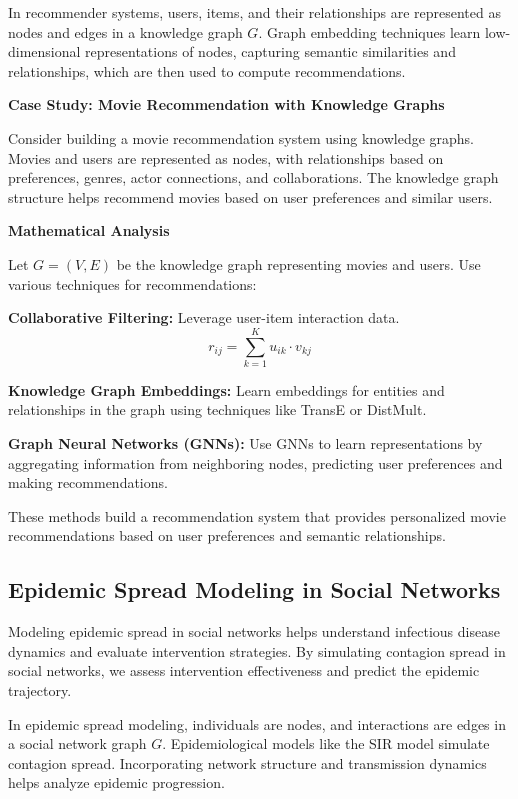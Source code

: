 \documentclass[12pt]{book} %
\begin{document}
In recommender systems, users, items, and their relationships are represented as nodes and edges in a knowledge graph \(G\). Graph embedding techniques learn low-dimensional representations of nodes, capturing semantic similarities and relationships, which are then used to compute recommendations.

\textbf{Case Study: Movie Recommendation with Knowledge Graphs}

Consider building a movie recommendation system using knowledge graphs. Movies and users are represented as nodes, with relationships based on preferences, genres, actor connections, and collaborations. The knowledge graph structure helps recommend movies based on user preferences and similar users.

\textbf{Mathematical Analysis}

Let \(G = (V, E)\) be the knowledge graph representing movies and users. Use various techniques for recommendations:

\textbf{Collaborative Filtering:} Leverage user-item interaction data.
\[ r_{ij} = \sum_{k=1}^{K} u_{ik} \cdot v_{kj} \]

\textbf{Knowledge Graph Embeddings:} Learn embeddings for entities and relationships in the graph using techniques like TransE or DistMult.

\textbf{Graph Neural Networks (GNNs):} Use GNNs to learn representations by aggregating information from neighboring nodes, predicting user preferences and making recommendations.

These methods build a recommendation system that provides personalized movie recommendations based on user preferences and semantic relationships.

\subsection{Epidemic Spread Modeling in Social Networks}

Modeling epidemic spread in social networks helps understand infectious disease dynamics and evaluate intervention strategies. By simulating contagion spread in social networks, we assess intervention effectiveness and predict the epidemic trajectory.

In epidemic spread modeling, individuals are nodes, and interactions are edges in a social network graph \(G\). Epidemiological models like the SIR model simulate contagion spread. Incorporating network structure and transmission dynamics helps analyze epidemic progression.
\end{document}
